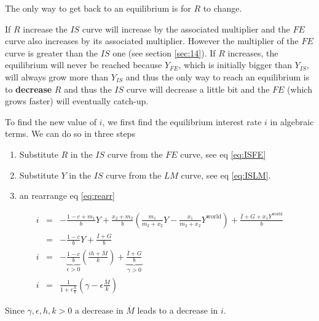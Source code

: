 \documentclass[a4paper] {scrartcl}
\begin{document}
The only way to get back to an equilibrium is for $R$ to change. 


If $R$ increase the $IS$ curve will increase by the associated multiplier and the $FE$ curve also increases by its associated multiplier. However the multiplier of the $FE$ curve is greater than the $IS$ one (see section \ref{sec:14}). If $R$ increases, the equilibrium will never be reached because $Y_{FE}$, which is initially bigger than $Y_{IS}$, will always grow more than $Y_{IS}$ and thus the only way to reach an equilibrium is to \textbf{decrease} $R$ and thus the $IS$ curve will decrease a little bit and the $FE$ (which grows faster) will eventually catch-up.

To find the new value of $i$, we first find the equilibrium interest rate $i$ in algebraic terms. We can do so in three steps
\begin{enumerate}
	\item Substitute $R$ in the $IS$ curve from the $FE$ curve, see eq \ref{eq:ISFE}
	\item Substitute $Y$ in the $IS$ curve from the $LM$ curve, see eq \ref{eq:ISLM}.
	\item an rearrange eq \ref{eq:rearr}
\end{enumerate}

\begin{eqnarray}
	\label{eq:ISFE}
	i &=& -\frac{1-c+m_1}{b}Y+\frac{x_2+m_2}{b}
	\left(
	\frac{m_1}{m_2+x_2}Y- \frac{x_1}{m_2+x_2}Y^{\text{world}}
	\right) 
	+
	\frac{\overline I + G + x_1Y^{\text{world}}}{b}
	\nonumber\\
	&=&
	-\frac{1-c}{b}Y
	+
	\frac{\overline I + G}{b}
	\\
	\label{eq:ISLM}
	i&=&
	-\underbrace{\frac{1-c}{b}}_{\epsilon>0}
	\left(\frac{ih +\overline M}{k}\right)
	+
	\underbrace{\frac{\overline I + G}{b}}_{\gamma>0}\\
	\label{eq:rearr}
	i &=&
	\frac{1}{1+\epsilon\frac{h}{k}}
	\left(
		\gamma-\epsilon\frac{\overline M}{k}
	\right)
\end{eqnarray}

Since $\gamma, \epsilon, h, k>0$ a decrease in $\overline M$ leads to a decrease in $i$.
\end{document}
